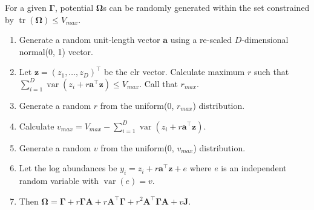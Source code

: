 \documentclass[12pt, letterpaper]{article}
\DeclareMathOperator{\var}{\text{var}}
\DeclareMathOperator{\tr}{\text{tr}}
\begin{document}
For a given $\bm{\Gamma}$, potential $\bm{\Omega}$s can be randomly generated within the set constrained by $\tr(\bm{\Omega}) \leq V_{max}$.
\begin{enumerate}
\item Generate a random unit-length vector $\bm{a}$ using a re-scaled $D$-dimensional normal(0, 1) vector.
\item Let $\bm{z} = (z_1, \dots, z_D)^\intercal$ be the clr vector. Calculate maximum $r$ such that $\sum_{i=1}^D \var(z_i + r \bm{a}^\intercal \bm{z}) \leq V_{max}$. Call that $r_{max}$.
\item Generate a random $r$ from the uniform(0, $r_{max}$) distribution.
\item Calculate $v_{max} = V_{max} - \sum_{i=1}^D \var(z_i + r \bm{a}^\intercal \bm{z})$.
\item Generate a random $v$ from the uniform(0, $v_{max}$) distribution.
\item Let the log abundances be $y_i = z_i + r \bm{a}^\intercal \bm{z} + e$ where $e$ is an independent random variable with $\var(e) = v$.
\item Then $\bm{\Omega} = \bm{\Gamma} + r \bm{\Gamma} \bm{A} + r \bm{A}^\intercal \bm{\Gamma} + r^2\bm{A}^\intercal \bm{\Gamma} \bm{A} + v\bm{J}$.
\end{enumerate}
\end{document}
